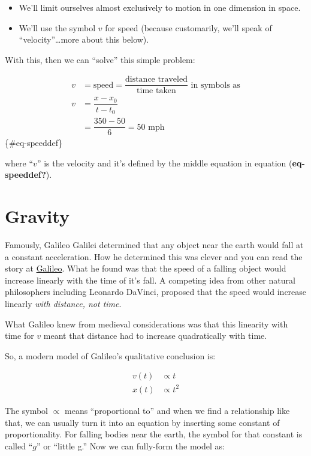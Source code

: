 \documentclass[
]{book}
\providecommand{\tightlist}{%
  \setlength{\itemsep}{0pt}\setlength{\parskip}{0pt}}
\begin{document}
\begin{itemize}
\tightlist
\item
  We'll limit ourselves almost exclusively to motion in one dimension in space.
\item
  We'll use the symbol \(v\) for speed (because customarily, we'll speak of ``velocity''\ldots more about this below).
\end{itemize}

With this, then we can ``solve'' this simple problem:

\begin{align}
v &= \text{speed}=\dfrac{\text{distance traveled}}{\text{time taken}} \text{ in symbols as} \nonumber \\
v &=\dfrac{x-x_0}{t-t_0} \nonumber \\
&= \dfrac{350-50}{6}=50  \text{ mph} \nonumber
\end{align}
\{\#eq-speeddef\}

where ``\(v\)'' is the velocity and it's defined by the middle equation in equation (\textbf{eq-speeddef?}).

\section{Gravity}\label{gravity}

Famously, Galileo Galilei determined that any object near the earth would fall at a constant acceleration. How he determined this was clever and you can read the story at \href{../../history/galileo_free_fall.qmd}{Galileo}. What he found was that the speed of a falling object would increase linearly with the time of it's fall. A competing idea from other natural philosophers including Leonardo DaVinci, proposed that the speed would increase linearly \emph{with distance, not time}.

What Galileo knew from medieval considerations was that this linearity with time for \(v\) meant that distance had to increase quadratically with time.

So, a modern model of Galileo's qualitative conclusion is:

\begin{align}
v(t) &\propto t \nonumber \\
x(t) &\propto t^2 \nonumber
\end{align}

The symbol \(\propto\) means ``proportional to'' and when we find a relationship like that, we can usually turn it into an equation by inserting some constant of proportionality. For falling bodies near the earth, the symbol for that constant is called ``\(g\)'' or ``little g.'' Now we can fully-form the model as:
\end{document}
